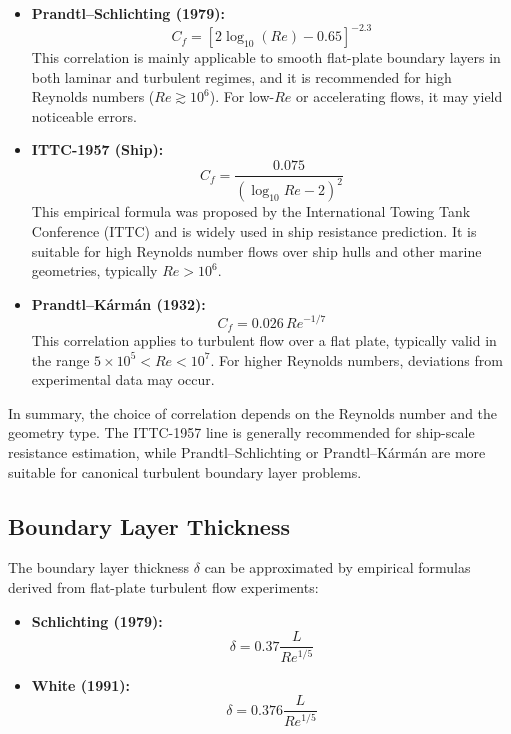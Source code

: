 \documentclass[12pt,a4paper]{article}
\begin{document}
\begin{itemize}
    \item \textbf{Prandtl–Schlichting (1979):}
    \begin{equation}
        C_f = \left[ 2 \log_{10}(Re) - 0.65 \right]^{-2.3}
    \end{equation}
    This correlation is mainly applicable to smooth flat-plate boundary layers in both laminar and turbulent regimes, and it is recommended for high Reynolds numbers ($Re \gtrsim 10^6$). For low-$Re$ or accelerating flows, it may yield noticeable errors.

    \item \textbf{ITTC-1957 (Ship):}
    \begin{equation}
        C_f = \frac{0.075}{(\log_{10} Re - 2)^2}
    \end{equation}
    This empirical formula was proposed by the International Towing Tank Conference (ITTC) and is widely used in ship resistance prediction. It is suitable for high Reynolds number flows over ship hulls and other marine geometries, typically $Re > 10^6$.

    \item \textbf{Prandtl–Kármán (1932):}
    \begin{equation}
        C_f = 0.026 \, Re^{-1/7}
    \end{equation}
    This correlation applies to turbulent flow over a flat plate, typically valid in the range $5 \times 10^5 < Re < 10^7$. For higher Reynolds numbers, deviations from experimental data may occur.
\end{itemize}

In summary, the choice of correlation depends on the Reynolds number and the geometry type. The ITTC-1957 line is generally recommended for ship-scale resistance estimation, while Prandtl–Schlichting or Prandtl–Kármán are more suitable for canonical turbulent boundary layer problems.

\subsection{Boundary Layer Thickness}

The boundary layer thickness $\delta$ can be approximated by empirical formulas derived from flat-plate turbulent flow experiments:

\begin{itemize}
    \item \textbf{Schlichting (1979):}
    \begin{equation}
        \delta = 0.37 \frac{L}{Re^{1/5}}
    \end{equation}

    \item \textbf{White (1991):}
    \begin{equation}
        \delta = 0.376 \frac{L}{Re^{1/5}}
    \end{equation}
\end{itemize}
\end{document}
